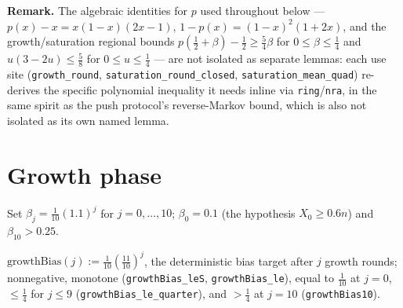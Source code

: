 \noindent\textbf{Remark.}
  The algebraic identities for $p$ used throughout below --- $p(x)-x =
  x(1-x)(2x-1)$, $1-p(x) = (1-x)^2(1+2x)$, and the growth/saturation
  regional bounds $p(\tfrac12+\beta)-\tfrac12 \ge \tfrac54\beta$ for
  $0\le\beta\le\tfrac14$ and $u(3-2u)\le\tfrac58$ for $0\le u\le\tfrac14$ ---
  are not isolated as separate lemmas: each use site
  (\texttt{growth\_round}, \texttt{saturation\_round\_closed},
  \texttt{saturation\_mean\_quad}) re-derives the specific polynomial
  inequality it needs inline via \texttt{ring}/\texttt{nra}, in the
  same spirit as the push protocol's reverse-Markov bound, which is also
  not isolated as its own named lemma.

\section{Growth phase}\label{mj:sec:growth}

Set $\beta_j = \tfrac1{10}(1.1)^j$ for $j=0,\dots,10$; $\beta_0=0.1$ (the
hypothesis $X_0\ge0.6n$) and $\beta_{10}>0.25$.

\begin{definition}\label{mj:growthbias}
  \rocqok
  $\mathrm{growthBias}(j) := \tfrac1{10}(\tfrac{11}{10})^j$, the deterministic
  bias target after $j$ growth rounds; nonnegative, monotone
  (\texttt{growthBias\_leS}, \texttt{growthBias\_le}), equal to
  $\tfrac1{10}$ at $j = 0$, $\le\tfrac14$ for $j\le9$
  (\texttt{growthBias\_le\_quarter}), and $>\tfrac14$ at $j=10$
  (\texttt{growthBias10}).
\end{definition}

